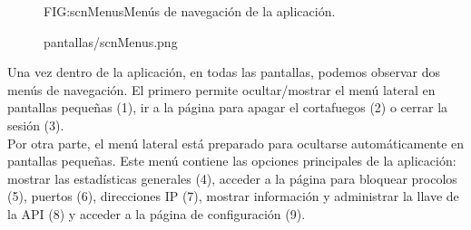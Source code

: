 \begin{figure}[Menús de navegación]{FIG:scnMenus}{Menús de navegación de la aplicación.}
  \begin{image}{}{}{pantallas/scnMenus.png}
  \end{image}
\end{figure}

Una vez dentro de la aplicación, en todas las pantallas, podemos observar dos menús de navegación. El primero permite ocultar/mostrar el menú lateral en pantallas pequeñas (1), ir a la página para apagar el cortafuegos (2) o cerrar la sesión (3).
\\Por otra parte, el menú lateral está preparado para ocultarse automáticamente en pantallas pequeñas. Este menú contiene las opciones principales de la aplicación: mostrar las estadísticas generales (4), acceder a la página para bloquear procolos (5), puertos (6), direcciones IP (7), mostrar información y administrar la llave de la API (8) y acceder a la página de configuración (9).